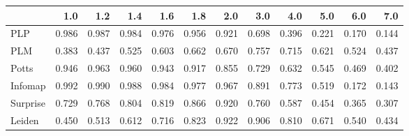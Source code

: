 \begin{tabular}{lrrrrrrrrrrr}
\toprule
{} &   1.0 &   1.2 &   1.4 &   1.6 &   1.8 &   2.0 &   3.0 &   4.0 &   5.0 &   6.0 &   7.0 \\
\midrule
PLP      & 0.986 & 0.987 & 0.984 & 0.976 & 0.956 & 0.921 & 0.698 & 0.396 & 0.221 & 0.170 & 0.144 \\
PLM      & 0.383 & 0.437 & 0.525 & 0.603 & 0.662 & 0.670 & 0.757 & 0.715 & 0.621 & 0.524 & 0.437 \\
Potts    & 0.946 & 0.963 & 0.960 & 0.943 & 0.917 & 0.855 & 0.729 & 0.632 & 0.545 & 0.469 & 0.402 \\
Infomap  & 0.992 & 0.990 & 0.988 & 0.984 & 0.977 & 0.967 & 0.891 & 0.773 & 0.519 & 0.172 & 0.143 \\
Surprise & 0.729 & 0.768 & 0.804 & 0.819 & 0.866 & 0.920 & 0.760 & 0.587 & 0.454 & 0.365 & 0.307 \\
Leiden   & 0.450 & 0.513 & 0.612 & 0.716 & 0.823 & 0.922 & 0.906 & 0.810 & 0.671 & 0.540 & 0.434 \\
\bottomrule
\end{tabular}
